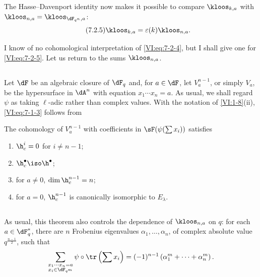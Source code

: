 The Hasse--Davenport identity now makes it possible to compare $\kloos_{k,a}$ 
with $\kloos_{n,a} = \kloos_{\dF_{q^n},a}$: 
\begin{equation*}\tag{7.2.5}\label{VI:eq:7-2-5}
  \kloos_{k,a} = \varepsilon(k) \kloos_{n,a} \text{.} 
\end{equation*}

I know of no cohomological interpretation of \eqref{VI:eq:7-2-4}, but 
I shall give one for \eqref{VI:eq:7-2-5}. Let us return to the sums $\kloos_{n,a}$. 





\subsection{}\label{VI:7-3}

Let $\dF$ be an algebraic closure of $\dF_q$ and, for $a\in \dF$, let 
$V_a^{n-1}$, or simply $V_a$, be the hypersurface in $\dA^n$ with equation 
$x_1 \dotsm x_n=a$. As usual, we shall regard $\psi$ as taking 
$\ell$-adic rather than complex values. With the notation of 
\ref{VI:1-8}(ii), \eqref{VI:eq:7-1-3} follows from 





\begin{theorem_}\label{VI:7-4}
The cohomology of $V_a^{n-1}$ with coefficients in $\sF(\psi(\sum x_i))$ satisfies 
\begin{enumerate}[\indent (i)]
  \item $\h_c^i=0$ for $i\ne n-1$; 
  \item $\h_c^\bullet{} \iso \h^\bullet{}$; 
  \item for $a\ne 0$, $\dim \h_c^{n-1}{}=n$; 
\item for $a=0$, $\h_c^{n-1}{}$ is canonically isomorphic to $E_\lambda$. 
\end{enumerate}
\end{theorem_}





\subsection{}\label{VI:7-5}

As usual, this theorem also controls the dependence of 
$\kloos_{n,a}$ on $q$: for each $a\in \dF_q^\ast$, there are $n$ Frobenius 
eigenvalues $\alpha_1,\dots,\alpha_n$, of complex absolute value 
$q^{\frac{n-1}{2}}$, such that 
\[
  \sum_{\substack{x_1\dotsm x_n = a \\ x_i\in \dF_{q^m}}} \psi\circ \tr\left(\sum x_i\right) = (-1)^{n-1} \left(\alpha_1^m + \cdots + \alpha_n^m \right) \text{.} 
\]

